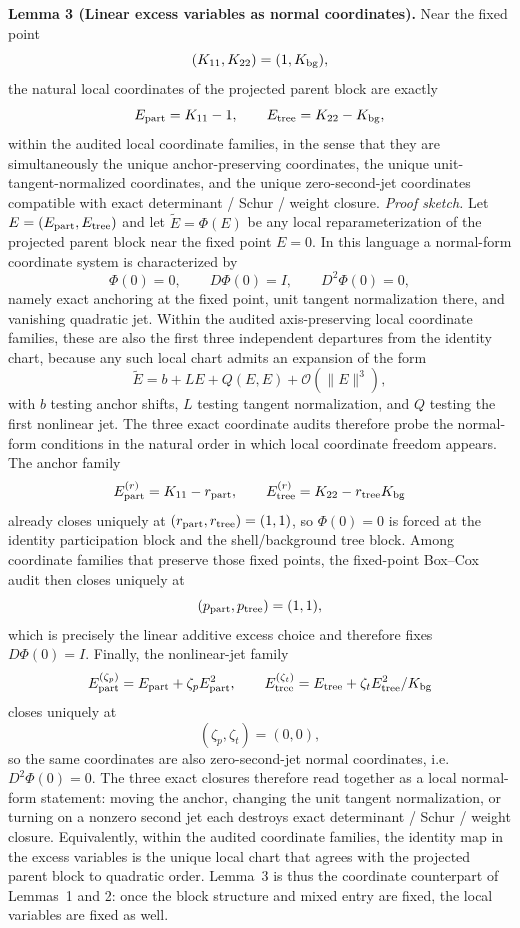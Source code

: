 \documentclass[aps,prd,onecolumn,notitlepage,nofootinbib,superscriptaddress,11pt,floatfix]{revtex4-2}
\begin{document}
\noindent\textbf{Lemma 3 (Linear excess variables as normal coordinates).}
Near the fixed point
\[
(K_{11},K_{22})=(1,K_{\rm bg}),
\]
the natural local coordinates of the projected parent block are exactly
\[
E_{\rm part}=K_{11}-1,
\qquad
E_{\rm tree}=K_{22}-K_{\rm bg},
\]
within the audited local coordinate families, in the sense that they are simultaneously the unique anchor-preserving coordinates, the unique unit-tangent-normalized coordinates, and the unique zero-second-jet coordinates compatible with exact determinant / Schur / weight closure.
\emph{Proof sketch.}
Let \(E=(E_{\rm part},E_{\rm tree})\) and let \(\widetilde E=\Phi(E)\) be any local reparameterization of the projected parent block near the fixed point \(E=0\). In this language a normal-form coordinate system is characterized by
\[
\Phi(0)=0,
\qquad
D\Phi(0)=I,
\qquad
D^2\Phi(0)=0,
\]
namely exact anchoring at the fixed point, unit tangent normalization there, and vanishing quadratic jet. Within the audited axis-preserving local coordinate families, these are also the first three independent departures from the identity chart, because any such local chart admits an expansion of the form
\[
\widetilde E
=
b+LE+Q(E,E)+\mathcal O(\|E\|^3),
\]
with \(b\) testing anchor shifts, \(L\) testing tangent normalization, and \(Q\) testing the first nonlinear jet. The three exact coordinate audits therefore probe the normal-form conditions in the natural order in which local coordinate freedom appears. The anchor family
\[
E_{\rm part}^{(r)}=K_{11}-r_{\rm part},
\qquad
E_{\rm tree}^{(r)}=K_{22}-r_{\rm tree}K_{\rm bg}
\]
already closes uniquely at \((r_{\rm part},r_{\rm tree})=(1,1)\), so \(\Phi(0)=0\) is forced at the identity participation block and the shell/background tree block. Among coordinate families that preserve those fixed points, the fixed-point Box--Cox audit then closes uniquely at
\[
(p_{\rm part},p_{\rm tree})=(1,1),
\]
which is precisely the linear additive excess choice and therefore fixes \(D\Phi(0)=I\). Finally, the nonlinear-jet family
\[
E_{\rm part}^{(\zeta_p)}=E_{\rm part}+\zeta_p E_{\rm part}^2,
\qquad
E_{\rm tree}^{(\zeta_t)}=E_{\rm tree}+\zeta_t E_{\rm tree}^2/K_{\rm bg}
\]
closes uniquely at
\[
(\zeta_p,\zeta_t)=(0,0),
\]
so the same coordinates are also zero-second-jet normal coordinates, i.e.\ \(D^2\Phi(0)=0\). The three exact closures therefore read together as a local normal-form statement: moving the anchor, changing the unit tangent normalization, or turning on a nonzero second jet each destroys exact determinant / Schur / weight closure. Equivalently, within the audited coordinate families, the identity map in the excess variables is the unique local chart that agrees with the projected parent block to quadratic order. Lemma~3 is thus the coordinate counterpart of Lemmas~1 and 2: once the block structure and mixed entry are fixed, the local variables are fixed as well.
\end{document}
